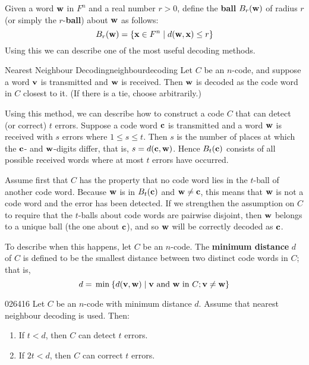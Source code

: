 Given a word $\textbf{w}$ in $F^{n}$ and a real number $r > 0$, define the \textbf{ball} $B_{r}(\textbf{w})$ of radius $r$ (or simply the $r$-\textbf{ball}) about $\textbf{w}$ as follows:
\begin{equation*}
B_{r}(\textbf{w}) = \{\textbf{x} \in F^n \mid d(\textbf{w}, \textbf{x}) \le r \}
\end{equation*}
Using this we can describe one of the most useful decoding methods.

\begin{theorem*}{Nearest Neighbour Decoding}{neighbourdecoding}
Let $C$ be an $n$-code, and suppose a word $\textbf{v}$ is transmitted and $\textbf{w}$ is received. Then $\textbf{w}$ is decoded as the code word in $C$ closest to it. (If there is a tie, choose arbitrarily.)
\end{theorem*}

Using this method, we can describe how to construct a code $C$ that can detect (or correct) $t$ errors. Suppose a code word $\textbf{c}$ is transmitted and a word $\textbf{w}$ is received with $s$ errors where $1 \leq s \leq t$. Then $s$ is the number of places at which the $\textbf{c}$- and $\textbf{w}$-digits differ, that is, $s = d(\textbf{c}, \textbf{w})$. Hence $B_{t}(\textbf{c})$ consists of all possible received words where at most $t$ errors have occurred.

Assume first that $C$ has the property that no code word lies in the $t$-ball of another code word. Because $\textbf{w}$ is in $B_{t}(\textbf{c})$ and $\textbf{w} \neq \textbf{c}$, this means that $\textbf{w}$ is not a code word and the error has been detected. If we strengthen the assumption on $C$ to require that the $t$-balls about code words are pairwise disjoint, then $\textbf{w}$ belongs to a unique ball (the one about $\textbf{c}$), and so $\textbf{w}$ will be correctly decoded as $\textbf{c}$.

To describe when this happens, let $C$ be an $n$-code. The \textbf{minimum distance} $d$ of $C$ is defined to be the smallest distance between two distinct code words in $C$; that is,
\begin{equation*}
d = \thinspace\operatorname{min\medspace} \{d(\textbf{v}, \textbf{w}) \mid \textbf{v} \mbox{ and } \textbf{w} \mbox{ in } C; \textbf{v} \neq \textbf{w} \}
\end{equation*}

\begin{theorem}{}{026416}
Let $C$ be an $n$-code with minimum distance $d$. Assume that nearest neighbour decoding is used. Then:

\begin{enumerate}
\item If $t < d$, then $C$ can detect $t$ errors.\footnotemark

\item If $2t < d$, then $C$ can correct $t$ errors.

\end{enumerate}
\end{theorem}

